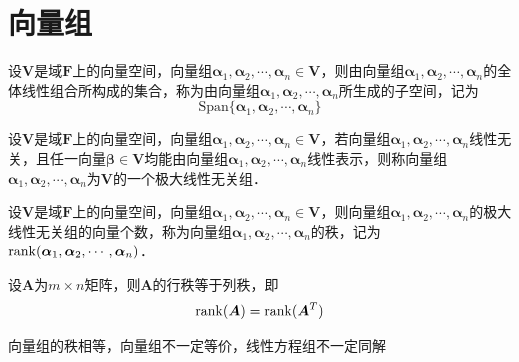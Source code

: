 \documentclass[12pt, a4paper, oneside, UTF8]{ctexbook}
\begin{document}
\section{向量组}
\begin{definition}
    设$\bm{V}$是域$\bm{F}$上的向量空间，向量组$\bm{\alpha}_1, \bm{\alpha}_2, \cdots, \bm{\alpha}_n \in \bm{V}$，则由向量组$\bm{\alpha}_1, \bm{\alpha}_2, \cdots, \bm{\alpha}_n$的全体线性组合所构成的集合，称为由向量组$\bm{\alpha}_1, \bm{\alpha}_2, \cdots, \bm{\alpha}_n$所生成的子空间，记为
    \[
        \mathrm{Span}\{\bm{\alpha}_1, \bm{\alpha}_2, \cdots, \bm{\alpha}_n\}
    \]
\end{definition}
\begin{definition}
    设$\bm{V}$是域$\bm{F}$上的向量空间，向量组$\bm{\alpha}_1, \bm{\alpha}_2, \cdots, \bm{\alpha}_n \in \bm{V}$，若向量组$\bm{\alpha}_1, \bm{\alpha}_2, \cdots, \bm{\alpha}_n$线性无关，且任一向量$\bm{\beta} \in \bm{V}$均能由向量组$\bm{\alpha}_1, \bm{\alpha}_2, \cdots, \bm{\alpha}_n$线性表示，则称向量组$\bm{\alpha}_1, \bm{\alpha}_2, \cdots, \bm{\alpha}_n$为$\bm{V}$的一个极大线性无关组．
\end{definition}
\begin{definition}
    设$\bm{V}$是域$\bm{F}$上的向量空间，向量组$\bm{\alpha}_1, \bm{\alpha}_2, \cdots, \bm{\alpha}_n \in \bm{V}$，则向量组$\bm{\alpha}_1, \bm{\alpha}_2, \cdots, \bm{\alpha}_n$的极大线性无关组的向量个数，称为向量组$\bm{\alpha}_1, \bm{\alpha}_2, \cdots, \bm{\alpha}_n$的秩，记为$\mathrm{rank}(\bm{\alpha}_1, \bm{\alpha}_2, \cdots, \bm{\alpha}_n)$．
\end{definition}
\begin{theorem}
    设$\bm{A}$为$m\times n$矩阵，则$\bm{A}$的行秩等于列秩，即
    \[
        \mathrm{rank}(\bm{A}) = \mathrm{rank}(\bm{A}^T)
    \]
\end{theorem}
\begin{myRemark}
    向量组的秩相等，向量组不一定等价，线性方程组不一定同解
\end{myRemark}
\end{document}
